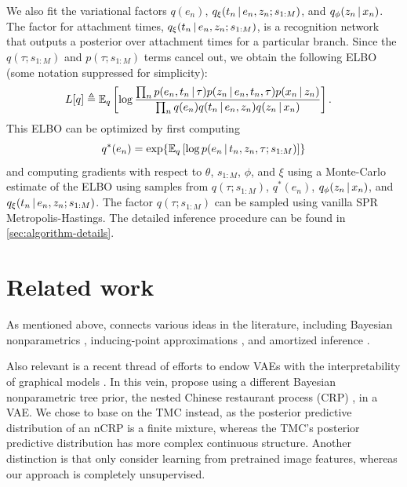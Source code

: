 We also fit the variational factors
$q(e_n)$,
$q_{\xi}(t_n \,|\, e_n, z_n; s_{1:M})$,
and
$q_\phi(z_n \,|\, x_n)$.
The factor for attachment times,
$q_{\xi}(t_n \,|\, e_n, z_n; s_{1:M})$, is a
recognition network that outputs
a posterior over attachment times for a particular branch.
Since the $q(\tau; s_{1:M})$ and $p(\tau; s_{1:M})$ terms
cancel out, we obtain the following ELBO (some notation suppressed for simplicity):
\begin{equation}
    \begin{split}
    L[q] &\triangleq \mathbb{E}_q \left[\log \frac{\prod_n p(e_n, t_n \,|\, \tau) p(z_n \,|\, e_n, t_n, \tau)p(x_n \,|\, z_n)}{\prod_n q(e_n)q(t_n \,|\, e_n, z_n)q(z_n \,|\, x_n)}\right].
    \end{split}
\end{equation}
This ELBO can be optimized by first computing
\begin{equation}
    q^*(e_n) = \exp{\E_q\left[\log p(e_n \given t_n, z_n, \tau; s_{1:M})\right]}
\end{equation}
and computing gradients with respect to $\theta$, $s_{1:M}$,
$\phi$, and $\xi$ using a Monte-Carlo estimate of the ELBO
using samples from $q(\tau; s_{1:M})$, $q^*(e_n)$, $q_\phi(z_n \,|\, x_n)$, and $q_{\xi}(t_n \,|\, e_n, z_n; s_{1:M})$.
The factor $q(\tau; s_{1:M})$ can
be sampled using vanilla SPR Metropolis-Hastings. 
The detailed inference procedure can be found in \autoref{sec:algorithm-details}.

\section{Related work}
As mentioned above, \acronym\;connects various ideas in the literature, including Bayesian nonparametrics \citep{boyles2012time}, inducing-point approximations \citep[e.g.; ][]{snelson2006sparse,tomczak2018vae},
and amortized inference \citep{kingma2013autoencoding,rezende2014stochastic}.

Also relevant is a recent thread of efforts to endow VAEs with the interpretability of graphical models \citep[e.g.; ][]{johnson2016svae,lin2018variational}.
In this vein, \citet{goyal2017nonparametric} propose using a different Bayesian nonparametric tree prior, the nested Chinese restaurant process (CRP) \citep{griffiths2004hierarchical}, in a VAE.
We chose to base \acronym\;on the TMC instead, as the posterior predictive distribution of an nCRP is a finite mixture, whereas the TMC's posterior predictive distribution has more complex continuous structure.
Another distinction is that \citet{goyal2017nonparametric} only consider learning from pretrained image features, whereas our approach is completely unsupervised.

